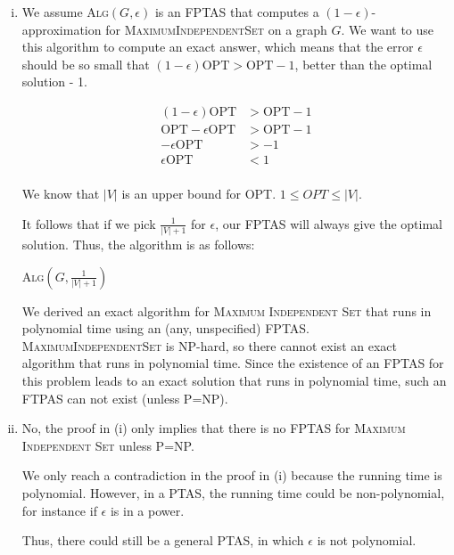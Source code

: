 \begin{enumerate}[(i)]
	\item We assume \textsc{Alg}$(G, \epsilon)$ is an FPTAS that computes a $(1 - \epsilon)$-approximation for \textsc{MaximumIndependentSet} on a graph $G$.
		We want to use this algorithm to compute an exact answer, which means that the error $\epsilon$ should be so small that $(1 - \epsilon) \text{OPT} > \text{OPT} - 1$, better than the optimal solution - 1.

		\begin{equation}
		\begin{split}
			(1 - \epsilon) \text{OPT} &> \text{OPT} - 1\\
			\text{OPT} - \epsilon \text{OPT} &> \text{OPT} - 1\\
			- \epsilon \text{OPT}& > -1\\
			\epsilon \text{OPT} &< 1\\
		\end{split}
		\end{equation}

		We know that $|V|$ is an upper bound for OPT.
		$1 \leq OPT \leq |V|$.

		It follows that if we pick $\frac{1}{|V|+1}$ for $\epsilon$, our FPTAS will always give the optimal solution.
		Thus, the algorithm is as follows:

\begin{sourcecode}
\return \textsc{Alg}$(G, \frac{1}{|V| + 1})$
\qend
\end{sourcecode}

		We derived an exact algorithm for \textsc{Maximum Independent Set} that runs in polynomial time using an (any, unspecified) FPTAS.
		\textsc{MaximumIndependentSet} is NP-hard, so there cannot exist an exact algorithm that runs in polynomial time.
		Since the existence of an FPTAS for this problem leads to an exact solution that runs in polynomial time, such an FTPAS can not exist (unless P=NP).

	\item No, the proof in (i) only implies that there is no FPTAS for \textsc{Maximum Independent Set} unless P=NP.

		We only reach a contradiction in the proof in (i) because the running time is polynomial.
		However, in a PTAS, the running time could be non-polynomial, for instance if $\epsilon$ is in a power.

		Thus, there could still be a general PTAS, in which $\epsilon$ is not polynomial.
\end{enumerate}
